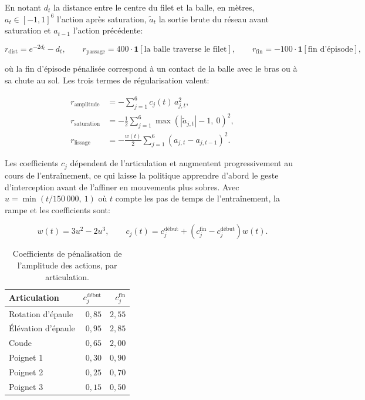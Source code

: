\documentclass[a4paper,11pt]{report}
\begin{document}
En notant \(d_t\) la distance entre le centre du filet et la balle, en mètres,
\(a_t \in [-1,1]^6\) l'action après saturation, \(\tilde{a}_t\) la sortie brute
du réseau avant saturation et \(a_{t-1}\) l'action précédente:

\begin{equation}
r_{\text{dist}} = e^{-2 d_t} - d_t,
\qquad
r_{\text{passage}} = 400 \cdot \mathbf{1}[\text{la balle traverse le filet}],
\qquad
r_{\text{fin}} = -100 \cdot \mathbf{1}[\text{fin d'épisode}],
\label{eq:reward-tache}
\end{equation}

où la fin d'épisode pénalisée correspond à un contact de la balle avec le bras
ou à sa chute au sol. Les trois termes de régularisation valent:

\begin{equation}
\begin{aligned}
r_{\text{amplitude}} &= -\sum_{j=1}^{6} c_j(t)\, a_{j,t}^2, \\
r_{\text{saturation}} &= -\frac{1}{2}\sum_{j=1}^{6}
  \max\left(|\tilde{a}_{j,t}|-1,\ 0\right)^2, \\
r_{\text{lissage}} &= -\frac{w(t)}{2}\sum_{j=1}^{6}
  \left(a_{j,t}-a_{j,t-1}\right)^2.
\end{aligned}
\label{eq:reward-regularisation}
\end{equation}

Les coefficients \(c_j\) dépendent de l'articulation et augmentent
progressivement au cours de l'entraînement, ce qui laisse la politique
apprendre d'abord le geste d'interception avant de l'affiner en mouvements plus
sobres. Avec \(u = \min(t/150\,000,\ 1)\) où \(t\) compte les pas de temps de
l'entraînement, la rampe et les coefficients sont:

\begin{equation}
w(t) = 3u^2 - 2u^3,
\qquad
c_j(t) = c_j^{\text{début}} + \left(c_j^{\text{fin}} - c_j^{\text{début}}\right) w(t).
\label{eq:reward-rampe}
\end{equation}

\begin{table}[H]
  \centering
  \caption{Coefficients de pénalisation de l'amplitude des actions, par articulation.}
  \label{tab:penalites-articulaires}
  \begin{tabular}{lrr}
    \toprule
    Articulation & \(c_j^{\text{début}}\) & \(c_j^{\text{fin}}\) \\
    \midrule
    Rotation d'épaule & \(0{,}85\) & \(2{,}55\) \\
    Élévation d'épaule & \(0{,}95\) & \(2{,}85\) \\
    Coude & \(0{,}65\) & \(2{,}00\) \\
    Poignet 1 & \(0{,}30\) & \(0{,}90\) \\
    Poignet 2 & \(0{,}25\) & \(0{,}70\) \\
    Poignet 3 & \(0{,}15\) & \(0{,}50\) \\
    \bottomrule
  \end{tabular}
\end{table}
\end{document}
